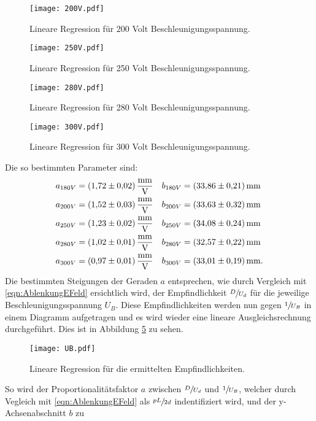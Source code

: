 \begin{figure}
  \centering
  \texttt{[image: 200V.pdf]}
  \caption{Lineare Regression für 200 Volt Beschleunigungsspannung.}
  \label{fig:200V}
\end{figure}
\begin{figure}
  \centering
  \texttt{[image: 250V.pdf]}
  \caption{Lineare Regression für 250 Volt Beschleunigungsspannung.}
  \label{fig:250V}
\end{figure}
\begin{figure}
  \centering
  \texttt{[image: 280V.pdf]}
  \caption{Lineare Regression für 280 Volt Beschleunigungsspannung.}
  \label{fig:280V}
\end{figure}
\begin{figure}
  \centering
  \texttt{[image: 300V.pdf]}
  \caption{Lineare Regression für 300 Volt Beschleunigungsspannung.}
  \label{fig:300V}
\end{figure}
\FloatBarrier
Die so bestimmten Parameter sind:
\begin{align*}
  a_{180V} &= \SI{1.72\pm0.02}{\milli\metre\per\volt} & b_{180V} &= \SI{33.86\pm0.21}{\milli\metre} \\
  a_{200V} &= \SI{1.52\pm0.03}{\milli\metre\per\volt} & b_{200V} &= \SI{33.63\pm0.32}{\milli\metre} \\
  a_{250V} &= \SI{1.23\pm0.02}{\milli\metre\per\volt} & b_{250V} &= \SI{34.08\pm0.24}{\milli\metre} \\
  a_{280V} &= \SI{1.02\pm0.01}{\milli\metre\per\volt} & b_{280V} &= \SI{32.57\pm0.22}{\milli\metre} \\
  a_{300V} &= \SI{0.97\pm0.01}{\milli\metre\per\volt} & b_{300V} &= \SI{33.01\pm0.19}{\milli\metre}.
\end{align*}
Die bestimmten Steigungen der Geraden $a$ entsprechen, wie durch Vergleich mit \eqref{eqn:AblenkungEFeld} ersichtlich wird, der Empfindlichkeit $\sfrac{D}{U_d}$ für
die jeweilige Beschleunigungsspannung $U_B$. Diese Empfindlichkeiten werden nun gegen $\sfrac{1}{U_B}$ in einem Diagramm aufgetragen und es wird wieder eine lineare
Ausgleichsrechnung durchgeführt. Dies ist in Abbildung \ref{fig:UB} zu sehen.
\begin{figure}
  \centering
  \texttt{[image: UB.pdf]}
  \caption{Lineare Regression für die ermittelten Empfindlichkeiten.}
  \label{fig:UB}
\end{figure}
So wird der Proportionalitätsfaktor $a$ zwischen $\sfrac{D}{U_d}$ und $\sfrac{1}{U_B}$, welcher durch Vegleich mit \eqref{eqn:AblenkungEFeld} als
$\sfrac{pL}{2d}$ indentifiziert wird, und der y-Achsenabschnitt $b$ zu
